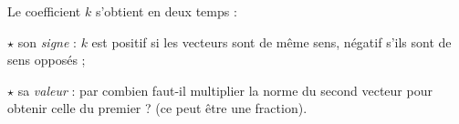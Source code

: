 \documentclass[border=4pt]{standalone}
\begin{document}
\begin{minipage}{8.5cm}\large \colorbox{orange!8}{\begin{minipage}{8.2cm}\par Le coefficient $k$ s'obtient en deux temps :\par $\star$ son \textit{signe} : $k$ est positif si les vecteurs sont de même sens, négatif s'ils sont de sens opposés ;\par $\star$ sa \textit{valeur} : par combien faut-il multiplier la norme du second vecteur pour obtenir celle du premier ? (ce peut être une fraction).\vspace{4pt}\end{minipage}}\end{minipage}
\end{document}
